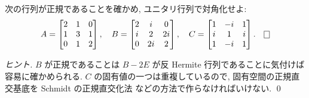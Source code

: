 \documentclass[12pt,twoside]{jarticle}
\begin{document}
\begin{question}[15点]
\label{q:normal-1}
  次の行列が正規であることを確かめ, ユニタリ行列で対角化せよ:
  \begin{equation*}
    A =
    \begin{bmatrix}
      2 & 1 & 0 \\
      1 & 3 & 1 \\
      0 & 1 & 2 \\
    \end{bmatrix},
    \quad
    B =
    \begin{bmatrix}
      2 & i  & 0 \\
      i & 2  & 2i \\
      0 & 2i & 2 \\
    \end{bmatrix},
    \quad
    C =
    \begin{bmatrix}
      1 & -i & 1 \\
      i &  1 & i \\
      1 & -i & 1 \\
    \end{bmatrix}.
    \qed
  \end{equation*}
\end{question}

\begin{proof}[ヒント]
  $B$ が正規であることは $B-2E$ が反 Hermite 行列であることに気付けば
  容易に確かめられる. 
  $C$ の固有値の一つは重複しているので, 
  固有空間の正規直交基底を Schmidt の正規直交化法
  などの方法で作らなければいけない.
  \qed
\end{proof}
\end{document}

